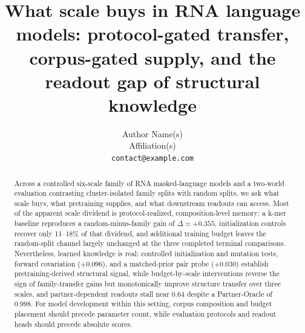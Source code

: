 \documentclass[11pt]{article}
\title{What scale buys in RNA language models: protocol-gated transfer, corpus-gated supply, and the readout gap of structural knowledge}
\author{Author Name(s)\\\normalsize Affiliation(s)\\\normalsize \texttt{contact@example.com}}
\date{}
\begin{document}
\maketitle

\begin{abstract}
Across a controlled six-scale family of RNA masked-language models and a two-world evaluation contrasting cluster-isolated family splits with random splits, we ask what scale buys, what pretraining supplies, and what downstream readouts can access. Most of the apparent scale dividend is protocol-realized, composition-level memory: a k-mer baseline reproduces a random-minus-family gain of \(\Delta=+0.355\), initialization controls recover only 11--18\% of that dividend, and additional training budget leaves the random-split channel largely unchanged at the three completed terminal comparisons. Nevertheless, learned knowledge is real: controlled initialization and mutation tests, forward covariation (\(+0.096\)), and a matched-prior pair probe (\(+0.030\)) establish pretraining-derived structural signal, while budget-by-scale interventions reverse the sign of family-transfer gains but monotonically improve structure transfer over three scales, and partner-dependent readouts stall near \(0.64\) despite a Partner-Oracle of \(0.998\). For model development within this setting, corpus composition and budget placement should precede parameter count, while evaluation protocols and readout heads should precede absolute scores.
\end{abstract}





\end{document}
